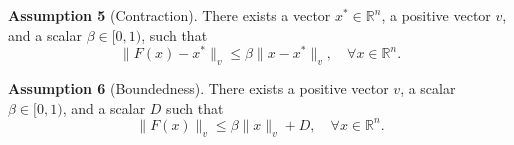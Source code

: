 \vspace{1em}

\noindent
\textbf{Assumption 5} (Contraction).
There exists a vector $x^* \in \mathbb{R}^n$, a positive vector $v$, and a scalar $\beta \in [0,1)$, such that
\begin{equation}
\|F(x) - x^*\|_v \leq \beta \|x - x^*\|_v, \quad \forall x \in \mathbb{R}^n.
\end{equation}

\vspace{1em}

\noindent
\textbf{Assumption 6} (Boundedness).
There exists a positive vector $v$, a scalar $\beta \in [0,1)$, and a scalar $D$ such that
\begin{equation}
\|F(x)\|_v \leq \beta\|x\|_v + D, \quad \forall x \in \mathbb{R}^n.
\end{equation}